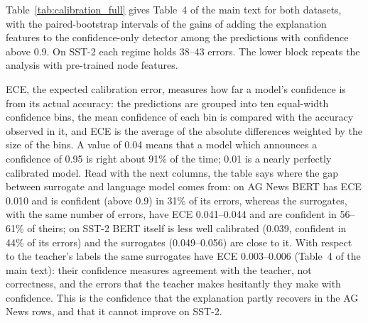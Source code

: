 \documentclass[3p,times,10pt,nopreprintline]{elsarticle}
\begin{document}
Table~\ref{tab:calibration_full} gives Table~4 of the main text for both datasets, with the paired-bootstrap intervals of the gains of adding the explanation features to the confidence-only detector among the predictions with confidence above 0.9. On SST-2 each regime holds 38--43 errors. The lower block repeats the analysis with pre-trained node features.

ECE, the expected calibration error, measures how far a model's confidence is from its actual accuracy: the predictions are grouped into ten equal-width confidence bins, the mean confidence of each bin is compared with the accuracy observed in it, and ECE is the average of the absolute differences weighted by the size of the bins. A value of 0.04 means that a model which announces a confidence of 0.95 is right about 91\% of the time; 0.01 is a nearly perfectly calibrated model. Read with the next columns, the table says where the gap between surrogate and language model comes from: on AG News BERT has ECE 0.010 and is confident (above 0.9) in 31\% of its errors, whereas the surrogates, with the same number of errors, have ECE 0.041--0.044 and are confident in 56--61\% of theirs; on SST-2 BERT itself is less well calibrated (0.039, confident in 44\% of its errors) and the surrogates (0.049--0.056) are close to it. With respect to the teacher's labels the same surrogates have ECE 0.003--0.006 (Table~4 of the main text): their confidence measures agreement with the teacher, not correctness, and the errors that the teacher makes hesitantly they make with confidence. This is the confidence that the explanation partly recovers in the AG News rows, and that it cannot improve on SST-2.

\begin{table}[H]
\centering
\scriptsize
\setlength{\tabcolsep}{3.5pt}
\caption{Calibration with respect to the gold labels and error detection among high-confidence predictions (confidence \(>0.9\)), with fine-tuned (upper block) and pre-trained (lower block) node features. \(\Delta\)AUROC and \(\Delta\)AUPRC: gain of adding the explanation features to the confidence-only detector within the regime (paired bootstrap, 95\% interval).}
\label{tab:calibration_full}
\end{table}
\end{document}
